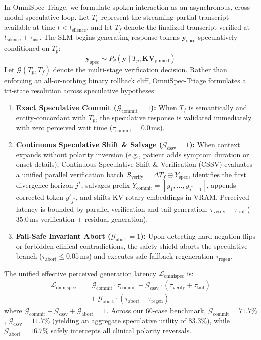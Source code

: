 \documentclass[10pt,journal,compsoc]{IEEEtran}
\begin{document}
In OmniSpec-Triage, we formulate spoken interaction as an asynchronous, cross-modal speculative loop. Let $T_p$ represent the streaming partial transcript available at time $t < t_{\text{silence}}$, and let $T_f$ denote the finalized transcript verified at $t_{\text{silence}} + \tau_{\text{asr}}$. The SLM begins generating response tokens
$\mathbf{y}_{\text{spec}}$ speculatively conditioned on $T_p$:
\begin{equation}
    \mathbf{y}_{\text{spec}} \sim P_{\theta}(\mathbf{y} \mid T_p, \mathbf{KV}_{\text{pinned}})
\end{equation}
Let $\mathcal{G}(T_p, T_f)$ denote the multi-stage verification decision. Rather than enforcing an all-or-nothing binary rollback cliff, OmniSpec-Triage formulates a tri-state resolution across speculative hypotheses:
\begin{enumerate}
    \item \textbf{Exact Speculative Commit ($\mathcal{G}_{\text{commit}} = 1$):} When $T_f$ is semantically and entity-concordant with $T_p$, the speculative response is validated immediately with zero perceived wait time ($\tau_{\text{commit}} = 0.0$\,ms).
    \item \textbf{Continuous Speculative Shift \& Salvage ($\mathcal{G}_{\text{cssv}} = 1$):} When context expands without polarity inversion (e.g., patient adds symptom duration or onset details), Continuous Speculative Shift \& Verification (CSSV) evaluates a unified parallel verification batch $\mathcal{B}_{\text{verify}} = \Delta T_f \oplus Y_{\text{spec}}$, identifies the first divergence horizon $j^*$, salvages prefix $Y_{\text{commit}} = [y_1, \dots, y_{j^*-1}]$, appends corrected token $y'_{j^*}$, and shifts KV rotary embeddings in VRAM. Perceived latency is bounded by parallel verification and tail generation: $\tau_{\text{verify}} + \tau_{\text{tail}}$ ($35.0$\,ms verification + residual generation).
    \item \textbf{Fail-Safe Invariant Abort ($\mathcal{G}_{\text{abort}} = 1$):} Upon detecting hard negation flips or forbidden clinical contradictions, the safety shield aborts the speculative branch ($\tau_{\text{abort}} \le 0.05$\,ms) and executes safe fallback regeneration $\tau_{\text{regen}}$.
\end{enumerate}
The unified effective perceived generation latency $\mathcal{L}_{\text{omnispec}}$ is:
\begin{equation}
\begin{split}
    \mathcal{L}_{\text{omnispec}} &= \mathcal{G}_{\text{commit}} \cdot \tau_{\text{commit}} + \mathcal{G}_{\text{cssv}} \cdot (\tau_{\text{verify}} + \tau_{\text{tail}}) \\
    &\quad + \mathcal{G}_{\text{abort}} \cdot (\tau_{\text{abort}} + \tau_{\text{regen}})
\end{split}
\end{equation}
where $\mathcal{G}_{\text{commit}} + \mathcal{G}_{\text{cssv}} + \mathcal{G}_{\text{abort}} = 1$. Across our 60-case benchmark, $\mathcal{G}_{\text{commit}} = 71.7\%$, $\mathcal{G}_{\text{cssv}} = 11.7\%$ (yielding an aggregate speculative utility of $83.3\%$), while $\mathcal{G}_{\text{abort}} = 16.7\%$ safely intercepts all clinical
polarity reversals.
\end{document}
